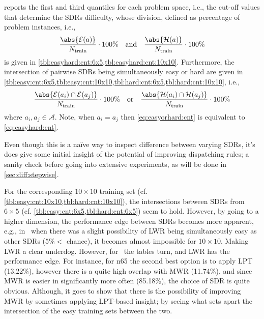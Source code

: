  reports the first and third quantiles for each problem space, i.e., the cut-off values that determine the SDRs difficulty, whose division, defined as percentage of problem instances, i.e., 
\begin{equation}\label{eq:easyhard:cnt}
\frac{\abs{\mathcal{E}(a)}}{N_{\text{train}}} \cdot 100\%
\quad \text{and} \quad 
\frac{\abs{\mathcal{H}(a)}}{N_{\text{train}}}\cdot 100\%
\end{equation}
is given in \cref{tbl:easyhard:cnt:6x5,tbl:easyhard:cnt:10x10}. Furthermore, the intersection of pairwise SDRs being simultaneously easy or hard are given in \cref{tbl:easy:cnt:6x5,tbl:easy:cnt:10x10,tbl:hard:cnt:6x5,tbl:hard:cnt:10x10}, i.e., 
\begin{equation}\label{eq:easyorhard:cnt}
\frac{\abs{\mathcal{E}(a_i)\cap \mathcal{E}(a_j) }}{N_{\text{train}}} \cdot 100\%
\quad \text{or} \quad 
\frac{\abs{\mathcal{H}(a_i)\cap \mathcal{H}(a_j)}}{N_{\text{train}}}\cdot 100\%
\end{equation}
where $a_i,a_j\in\mathcal{A}$. Note, when $a_i=a_j$ then \cref{eq:easyorhard:cnt} is equivalent to \cref{eq:easyhard:cnt}.

Even though this is a na\"ive way to inspect difference between varying SDRs, it's does give some initial insight of the potential of improving dispatching rules; a sanity check before going into extensive experiments, as will be done in \cref{sec:diff:stepwise}.

For the corresponding $10\times10$ training set (cf. \cref{tbl:easy:cnt:10x10,tbl:hard:cnt:10x10}), the intersections between SDRs from $6\times5$ (cf. \cref{tbl:easy:cnt:6x5,tbl:hard:cnt:6x5}) seem to hold. However, by going to a higher dimension, the performance edge between SDRs becomes more apparent, e.g., in \JSP\ when there was a slight possibility of LWR being simultaneously easy as other SDRs ($5\%<$ chance), it becomes almost impossible for $10\times10$. Making LWR a clear underdog. However, for \FSP\ the tables turn, and LWR has the performance edge. For instance, for n{6}{5} the second  best option is to apply LPT (13.22\%), however there is a quite high overlap with MWR (11.74\%), and since MWR is easier in significantly more often (85.18\%), the choice of SDR is quite obvious. Although, it goes to show that there is the possibility of improving MWR by sometimes applying LPT-based insight; by seeing what sets apart the intersection of the easy training sets between the two. 

